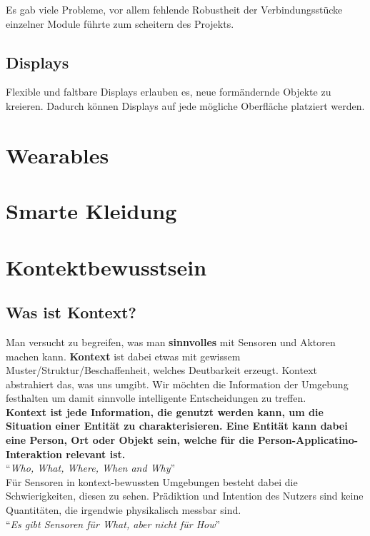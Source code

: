 \documentclass[a4paper]{article}
\begin{document}
Es gab viele Probleme, vor allem fehlende Robustheit der Verbindungsstücke einzelner Module führte zum scheitern des Projekts.

\subsection{Displays}
Flexible und faltbare Displays erlauben es, neue formändernde Objekte zu kreieren. Dadurch können Displays auf jede mögliche Oberfläche platziert werden. 

\newpage
\section{Wearables}
\newpage
\section{Smarte Kleidung}
\newpage
\section{Kontektbewusstsein}
\subsection{Was ist Kontext?}
Man versucht zu begreifen, was man \textbf{sinnvolles} mit Sensoren und Aktoren machen kann. \textbf{Kontext} ist dabei etwas mit gewissem Muster/Struktur/Beschaffenheit, welches Deutbarkeit erzeugt. Kontext abstrahiert das, was uns umgibt. Wir möchten die Information der Umgebung festhalten um damit sinnvolle intelligente Entscheidungen zu treffen.\\

\textbf{Kontext ist jede Information, die genutzt werden kann, um die Situation einer Entität zu charakterisieren. Eine Entität kann dabei eine Person, Ort oder Objekt sein, welche für die Person-Applicatino-Interaktion relevant ist.}\\

``\textit{Who, What, Where, When and Why}'' \\

Für Sensoren in kontext-bewussten Umgebungen besteht dabei die Schwierigkeiten, diesen zu sehen. Prädiktion und Intention des Nutzers sind keine Quantitäten, die irgendwie physikalisch messbar sind. \\

``\textit{Es gibt Sensoren für What, aber nicht für How}''
\end{document}

